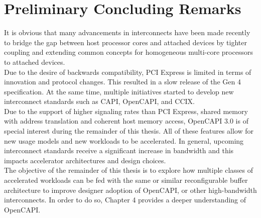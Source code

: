 \section{Preliminary Concluding Remarks}
\label{sec:3compare}
It is obvious that many advancements in interconnects have been made recently to bridge the gap between host processor cores and attached devices by tighter coupling and extending common concepts for homogeneous multi-core processors to attached devices.\\
Due to the desire of backwards compatibility, PCI Express is limited in terms of innovation and protocol changes. This resulted in a slow release of the Gen 4 specification. At the same time, multiple initiatives started to develop new interconnect standards such as CAPI, OpenCAPI, and CCIX.\\
Due to the support of higher signaling rates than PCI Express, shared memory with address translation and coherent host memory access, OpenCAPI 3.0 is of special interest during the remainder of this thesis. All of these features allow for new usage models and new workloads to be accelerated. In general, upcoming interconnect standards receive a significant increase in bandwidth and this impacts accelerator architectures and design choices.\\
The objective of the remainder of this thesis is to explore how multiple classes of accelerated workloads can be fed with the same or similar reconfigurable buffer architecture to improve designer adoption of OpenCAPI, or other high-bandwidth interconnects. In order to do so, Chapter 4 provides a deeper understanding of OpenCAPI.





